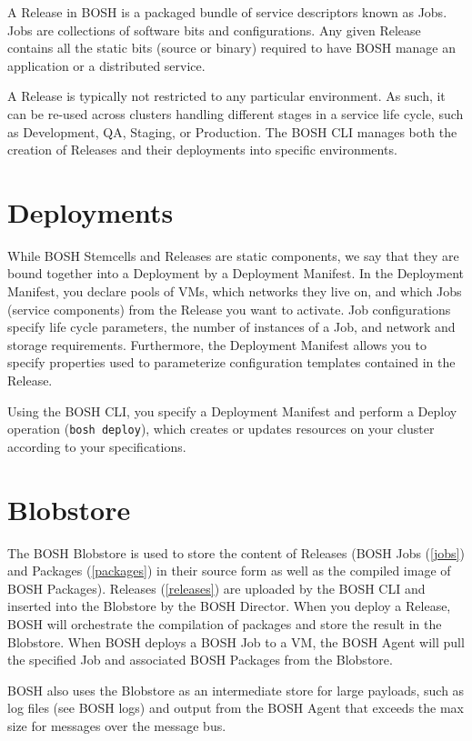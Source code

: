 A Release in BOSH is a packaged bundle of service descriptors known as Jobs. Jobs are collections of software bits and configurations. Any given Release contains all the static bits (source or binary) required to have BOSH manage an application or a distributed service. 

A Release is typically not restricted to any particular environment. As such, it can be re-used across clusters handling different stages in a service life cycle, such as Development, QA, Staging, or Production. The BOSH CLI manages both the creation of Releases and their deployments into specific environments.

\section{Deployments}
\label{deployments}

While BOSH Stemcells and Releases are static components, we say that they are bound together into a Deployment by a Deployment Manifest. In the Deployment Manifest, you declare pools of VMs, which networks they live on, and which Jobs (service components) from the Release you want to activate. Job configurations specify life cycle parameters, the number of instances of a Job, and network and storage requirements. Furthermore, the Deployment Manifest allows you to specify properties used to parameterize configuration templates contained in the Release.

Using the BOSH CLI, you specify a Deployment Manifest and perform a Deploy operation (\texttt{bosh deploy}), which creates or updates resources on your cluster according to your specifications.

\section{Blobstore}
\label{blobstore}

The BOSH Blobstore is used to store the content of Releases (BOSH Jobs (\autoref{jobs}) and Packages (\autoref{packages}) in their source form as well as the compiled image of BOSH Packages). Releases (\autoref{releases}) are uploaded by the BOSH CLI and inserted into the Blobstore by the BOSH Director. When you deploy a Release, BOSH will orchestrate the compilation of packages and store the result in the Blobstore. When BOSH deploys a BOSH Job to a VM, the BOSH Agent will pull the specified Job and associated BOSH Packages from the Blobstore.

BOSH also uses the Blobstore as an intermediate store for large payloads, such as log files (see BOSH logs) and output from the BOSH Agent that exceeds the max size for messages over the message bus.

